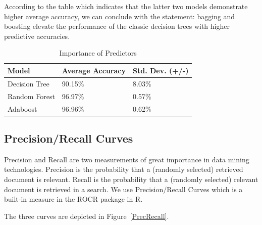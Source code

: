 \documentclass[letter]{article}
\begin{document}
According to the table which indicates that the latter two models demonstrate
higher average accuracy, we can conclude with the statement: bagging and 
boosting elevate the performance of the classic decision trees with higher
predictive accuracies.

\begin{table}[!htbp]
\centering
\caption{Importance of Predictors}\label{imp}
\begin{tabular}{lll}
\hline
\hline
Model& Average Accuracy& Std. Dev. (+/-) \\
  \hline
Decision Tree& 90.15\% & 8.03\%\\
Random Forest& 96.97\% & 0.57\%\\
Adaboost& 96.96\% & 0.62\%\\
\hline
\hline
\end{tabular}
\end{table}

\subsection{Precision/Recall Curves}
Precision and Recall are two measurements of great importance in data mining
technologies. Precision is the probability that a (randomly selected) 
retrieved document is relevant. Recall is the probability that a (randomly 
selected) relevant document is retrieved in a search. We use Precision/Recall
Curves which is a built-in measure in the ROCR package in R. 

The three curves are depicted in Figure~\ref{PrecRecall}.
\end{document}
